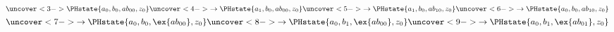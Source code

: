 \begin{frame}[t]

\medskip
$ \uncover<3->{\PHstate{a_0, b_0, ab_{00}, z_0}}
  \uncover<4->{\rightarrow\PHstate{a_1, b_0, ab_{00}, z_0}}
  \uncover<5->{\rightarrow\PHstate{a_1, b_0, ab_{10}, z_0}}
  \uncover<6->{\rightarrow\PHstate{a_0, b_0, ab_{10}, z_0}}$
\\ \qquad
$ \uncover<7->{\rightarrow\PHstate{a_0, b_0, \ex{ab_{00}}, z_0}}
  \uncover<8->{\rightarrow\PHstate{a_0, b_1, \ex{ab_{00}}, z_0}}
  \uncover<9->{\rightarrow\PHstate{a_0, b_1, \ex{ab_{01}}, z_0}}$
\end{frame}
